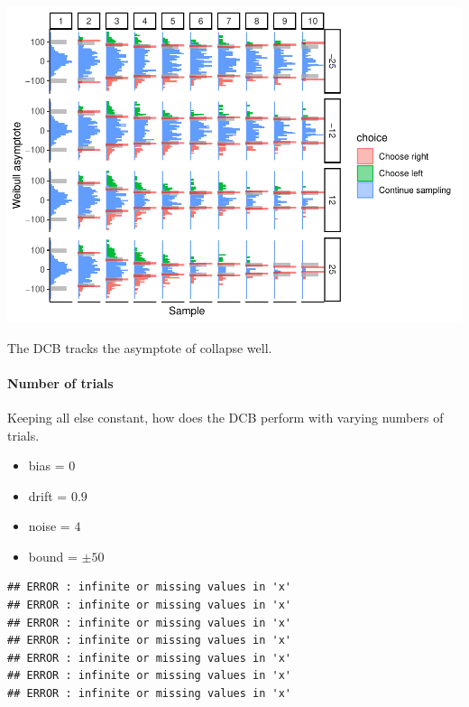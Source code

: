 \documentclass[
]{book}
\providecommand{\tightlist}{%
  \setlength{\itemsep}{0pt}\setlength{\parskip}{0pt}}
\begin{document}
\includegraphics{LateNightBayes_files/figure-latex/unnamed-chunk-14-1.pdf}

The DCB tracks the asymptote of collapse well.

\hypertarget{number-of-trials-1}{%
\paragraph*{Number of trials}\label{number-of-trials-1}}

Keeping all else constant, how does the DCB perform with varying numbers of trials.

\begin{itemize}
\tightlist
\item
  bias = \(0\)
\item
  drift = \(0.9\)
\item
  noise = \(4\)
\item
  bound = \(\pm 50\)
\end{itemize}

\begin{verbatim}
## ERROR : infinite or missing values in 'x' 
## ERROR : infinite or missing values in 'x' 
## ERROR : infinite or missing values in 'x' 
## ERROR : infinite or missing values in 'x' 
## ERROR : infinite or missing values in 'x' 
## ERROR : infinite or missing values in 'x' 
## ERROR : infinite or missing values in 'x'
\end{verbatim}
\end{document}
